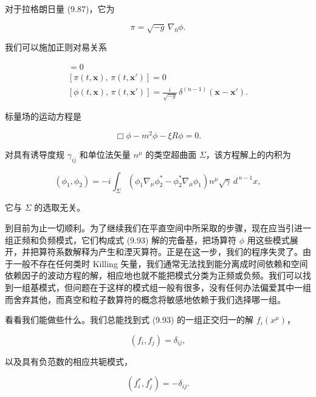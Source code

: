 对于拉格朗日量 (9.87)，它为

\begin{equation*}
\pi = \sqrt{-g}\,\nabla_0\phi.
\tag{9.91}
\end{equation*}

我们可以施加正则对易关系

\begin{gather*}
[\phi(t,\mathbf{x}),\, \phi(t,\mathbf{x}')] = 0 \\
[\pi(t,\mathbf{x}),\, \pi(t,\mathbf{x}')] = 0 \\
[\phi(t,\mathbf{x}),\, \pi(t,\mathbf{x}')] = \frac{i}{\sqrt{-g}}\,\delta^{(n-1)}(\mathbf{x}-\mathbf{x}').
\tag{9.92}
\end{gather*}

标量场的运动方程是

\begin{equation*}
\Box\phi - m^2\phi - \xi R\phi = 0.
\tag{9.93}
\end{equation*}

对具有诱导度规 $\gamma_{ij}$ 和单位法矢量 $n^{\mu}$ 的类空超曲面 $\Sigma$，该方程解上的内积为

\begin{equation*}
(\phi_1, \phi_2) = -i\int_{\Sigma}\left(\phi_1\nabla_{\mu}\phi^{*}_2 - \phi^{*}_2\nabla_{\mu}\phi_1\right)n^{\mu}\sqrt{\gamma}\, d^{\,n-1}x,
\tag{9.94}
\end{equation*}

它与 $\Sigma$ 的选取无关。

到目前为止一切顺利。为了继续我们在平直空间中所采取的步骤，现在应当引进一组正频和负频模式，它们构成式 (9.93) 解的完备基，把场算符 $\phi$ 用这些模式展开，并把算符系数解释为产生和湮灭算符。正是在这一步，我们的程序失灵了。由于一般不存在任何类时 Killing 矢量，我们通常无法找到能分离成时间依赖和空间依赖因子的波动方程的解，相应地也就不能把模式分类为正频或负频。我们可以找到一组基模式，但问题在于这样的模式组一般有很多，没有任何办法偏爱其中一组而舍弃其他，而真空和粒子数算符的概念将敏感地依赖于我们选择哪一组。

看看我们能做些什么。我们总能找到式 (9.93) 的一组正交归一的解 $f_i(x^{\mu})$，

\begin{equation*}
(f_i, f_j) = \delta_{ij},
\tag{9.95}
\end{equation*}

以及具有负范数的相应共轭模式，

\begin{equation*}
(f^{*}_i, f^{*}_j) = -\delta_{ij}.
\tag{9.96}
\end{equation*}

